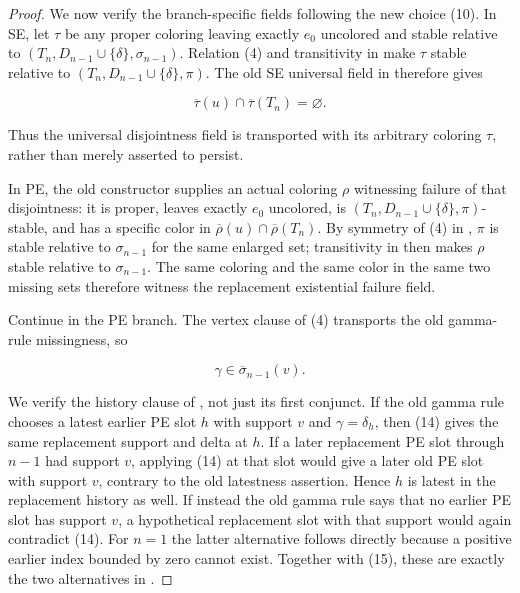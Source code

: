 \begin{proof}
We now verify the branch-specific fields following the new choice (10).
In SE, let \(\tau\) be any proper coloring leaving exactly \(e_0\)
uncolored and stable relative to
\((T_n,D_{n-1}\cup\{\delta\},\sigma_{n-1})\).  Relation (4) and
transitivity in  make \(\tau\) stable relative to
\((T_n,D_{n-1}\cup\{\delta\},\pi)\).  The old SE universal field in
 therefore gives

\[
 \overline\tau(u)\cap\overline\tau(T_n)=\varnothing.
\]

Thus the universal disjointness field is transported with its arbitrary
coloring \(\tau\), rather than merely asserted to persist.

In PE, the old constructor supplies an actual coloring \(\rho\) witnessing
failure of that disjointness: it is proper, leaves exactly \(e_0\)
uncolored, is
\((T_n,D_{n-1}\cup\{\delta\},\pi)\)-stable, and has a specific color
in \(\overline\rho(u)\cap\overline\rho(T_n)\).  By symmetry of (4) in
, \(\pi\) is stable relative to \(\sigma_{n-1}\) for the
same enlarged set; transitivity in  then makes \(\rho\)
stable relative to \(\sigma_{n-1}\).  The same coloring and the same
color in the same two missing sets therefore witness the replacement
existential failure field.

Continue in the PE branch.  The vertex clause of (4) transports the old
gamma-rule missingness, so

\[
                         \gamma\in\overline{\sigma}_{n-1}(v). \tag{15}
\]

We verify the history clause of , not
just its first conjunct.  If the old gamma rule chooses a latest earlier
PE slot \(h\) with support \(v\) and \(\gamma=\delta_h\), then (14)
gives the same replacement support and delta at \(h\).  If a later
replacement PE slot through \(n-1\) had support \(v\), applying (14) at
that slot would give a later old PE slot with support \(v\), contrary to
the old latestness assertion.  Hence \(h\) is latest in the replacement
history as well.  If instead the old gamma rule says that no earlier PE
slot has support \(v\), a hypothetical replacement slot with that support
would again contradict (14).  For \(n=1\) the latter alternative follows
directly because a positive earlier index bounded by zero cannot exist.
Together with (15), these are exactly the two alternatives in
.


\end{proof}
